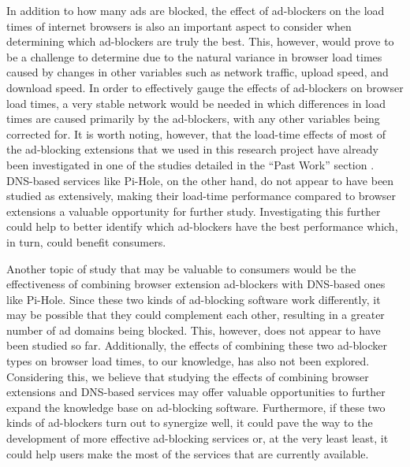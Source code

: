 \documentclass[sigsmall]{acmart}
\begin{document}
 In addition to how many ads are blocked, the effect of ad-blockers on the load times of internet browsers is also an important aspect to consider when determining which ad-blockers are truly the best. This, however, would prove to be a challenge to determine due to the natural variance in browser load times caused by changes in other variables such as network traffic, upload speed, and download speed. In order to effectively gauge the effects of ad-blockers on browser load times, a very stable network would be needed in which differences in load times are caused primarily by the ad-blockers, with any other variables being corrected for. It is worth noting, however, that the load-time effects of most of the ad-blocking extensions that we used in this research project have already been investigated in one of the studies detailed in the “Past Work” section \cite{10.1145/3091478.3091514}. DNS-based services like Pi-Hole, on the other hand, do not appear to have been studied as extensively, making their load-time performance compared to browser extensions a valuable opportunity for further study. Investigating this further could help to better identify which ad-blockers have the best performance which, in turn, could benefit consumers.
	
 Another topic of study that may be valuable to consumers would be the effectiveness of combining browser extension ad-blockers with DNS-based ones like Pi-Hole. Since these two kinds of ad-blocking software work differently, it may be possible that they could complement each other, resulting in a greater number of ad domains being blocked. This, however, does not appear to have been studied so far. Additionally, the effects of combining these two ad-blocker types on browser load times, to our knowledge, has also not been explored. Considering this, we believe that studying the effects of combining browser extensions and DNS-based services may offer valuable opportunities to further expand the knowledge base on ad-blocking software. Furthermore, if these two kinds of ad-blockers turn out to synergize well, it could pave the way to the development of more effective ad-blocking services or, at the very least least, it could help users make the most of the services that are currently available.
	
\end{document}
